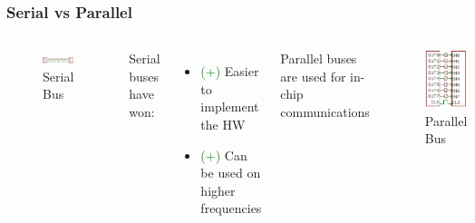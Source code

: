 \documentclass[aspectratio=169,usenames,dvipsnames]{beamer}
\begin{document}
\begin{frame}
  \frametitle{Serial vs Parallel}
  \begin{columns}
      \begin{figure}
        \centering
        \includegraphics[scale=0.45]{images/serial-bus.png}
        \caption{Serial Bus}
      \end{figure}
      Serial buses have won:
      \begin{itemize}
        \item[] \textcolor{green}{(+)} Easier to implement the HW
        \item[] \textcolor{green}{(+)} Can be used on higher frequencies
      \end{itemize}
      Parallel buses are used for in-chip communications
      \begin{figure}
        \centering
        \includegraphics[scale=0.45]{images/parallel-bus.png}
        \caption{Parallel Bus}
      \end{figure}
  \end{columns}
\end{frame}
\end{document}
